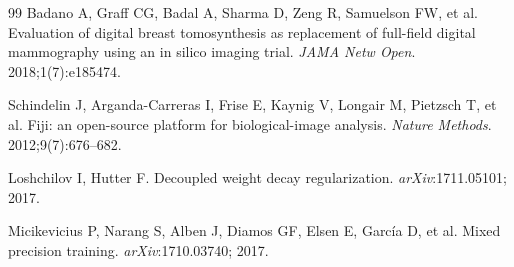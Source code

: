 \documentclass[11pt]{article}
\begin{document}
\begin{thebibliography}{99}
Badano A, Graff CG, Badal A, Sharma D, Zeng R, Samuelson FW, et al.
Evaluation of digital breast tomosynthesis as replacement of full-field digital
mammography using an in silico imaging trial.
\emph{JAMA Netw Open}. 2018;1(7):e185474.

Schindelin J, Arganda-Carreras I, Frise E, Kaynig V, Longair M, Pietzsch T, et al.
Fiji: an open-source platform for biological-image analysis.
\emph{Nature Methods}. 2012;9(7):676--682.

Loshchilov I, Hutter F.
Decoupled weight decay regularization.
\emph{arXiv}:1711.05101; 2017.

Micikevicius P, Narang S, Alben J, Diamos GF, Elsen E, Garc{\'i}a D, et al.
Mixed precision training. \emph{arXiv}:1710.03740; 2017.

\end{thebibliography}
\end{document}
